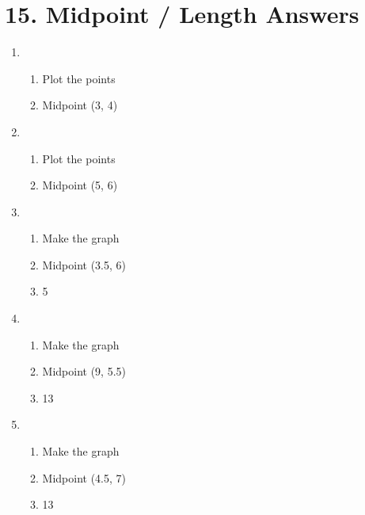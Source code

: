 \documentclass[11pt]{article}
\begin{document}
\section*{15. Midpoint / Length Answers}
\begin{enumerate}
	\item 
	\begin{enumerate}
		\item Plot the points
		\item Midpoint (3, 4)
	\end{enumerate}
	\item 
	\begin{enumerate}
		\item Plot the points
		\item Midpoint (5, 6)
	\end{enumerate}
	\item 
	\begin{enumerate}
		\item Make the graph
		\item Midpoint (3.5, 6)
		\item 5
	\end{enumerate}
	\item
	\begin{enumerate}
		\item Make the graph
		\item Midpoint (9, 5.5)
		\item 13
	\end{enumerate}
	\item
	\begin{enumerate}
		\item Make the graph
		\item Midpoint (4.5, 7)
		\item 13
	\end{enumerate}
\end{enumerate}
\end{document}
